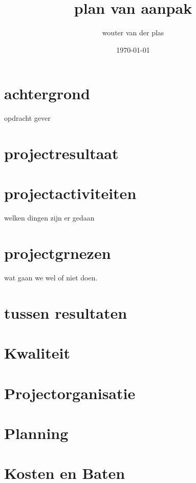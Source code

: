 \documentclass[oneside]{book}
\title{plan van aanpak}
\author{wouter van der plas}
\date{\today}
\begin{document}
\maketitle
\tableofcontents
{}


\chapter{achtergrond}
opdracht gever
\clearpage
\chapter{projectresultaat}
\clearpage
\chapter{projectactiviteiten}
welken dingen zijn er gedaan
\clearpage
\chapter{projectgrnezen}
wat gaan we wel of niet doen.
\clearpage
\chapter{tussen resultaten}
\clearpage
\chapter{Kwaliteit}
\clearpage
\chapter{Projectorganisatie}
\clearpage
\chapter{Planning}
\clearpage
\chapter{Kosten en Baten}
\clearpage
\end{document}
